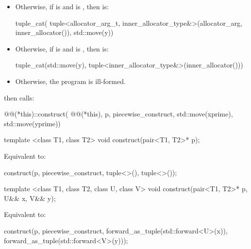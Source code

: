 \begin{itemdescr}
\begin{itemize}
\item Otherwise, if  is 
and
is
, then  is:
\begin{codeblock}
tuple_cat(
    tuple<allocator_arg_t, inner_allocator_type&>(allocator_arg, inner_allocator()),
    std::move(y))
\end{codeblock}

\item Otherwise, if  is
 and
 is ,
then  is:
\begin{codeblock}
tuple_cat(std::move(y), tuple<inner_allocator_type&>(inner_allocator()))
\end{codeblock}

\item Otherwise, the program is ill-formed.
\end{itemize}
then calls:
\begin{codeblock}
@@(*this)::construct(
    @@(*this), p, piecewise_construct, std::move(xprime), std::move(yprime))
\end{codeblock}
\end{itemdescr}

%
\begin{itemdecl}
template <class T1, class T2>
  void construct(pair<T1, T2>* p);
\end{itemdecl}

\begin{itemdescr}
\pnum
\effects Equivalent to:
\begin{codeblock}
construct(p, piecewise_construct, tuple<>(), tuple<>());
\end{codeblock}
\end{itemdescr}

%
\begin{itemdecl}
template <class T1, class T2, class U, class V>
  void construct(pair<T1, T2>* p, U&& x, V&& y);
\end{itemdecl}

\begin{itemdescr}
\pnum
\effects Equivalent to:
\begin{codeblock}
construct(p, piecewise_construct,
          forward_as_tuple(std::forward<U>(x)),
          forward_as_tuple(std::forward<V>(y)));
\end{codeblock}
\end{itemdescr}

